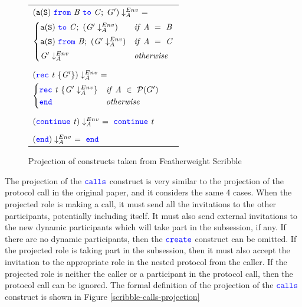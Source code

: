 \documentclass[12pt,twoside]{report}
\begin{document}
\begin{figure}[!h]
    \begin{center}
        \begin{tabular}{l}
            $(\scrmessage{a}{S}\ \from\ \mathit{B}\ \scrto\ \mathit{C};\ G') \project\ =\ $\\[3.5pt]
            \begin{math}
                \begin{cases}
                    \mathtt{a}(\mathtt{S})\ {\color{blue}\mathtt{to}}\ \mathit{C};\ (\mathit{G'} \downarrow_A^{Env}) & \mathit{if}\ \mathit{A}\ =\ \mathit{B}\\[3pt]
                    \mathtt{a}(\mathtt{S})\ {\color{blue}\mathtt{from}}\ \mathit{B};\ (\mathit{G'} \downarrow_A^{Env}) & \mathit{if}\ \mathit{A}\ =\ \mathit{C}\\[3pt]
                    \mathit{G'} \downarrow_A^{Env} & \mathit{otherwise}
                \end{cases}
            \end{math}
            \\\\
            $(\rec\ \mathit{t}\ \{\mathit{G'}\}) \project\ =$\\[3.5pt]
            \begin{math}
               \begin{cases}
                   {\color{blue}\mathtt{rec}}\ \mathit{t}\ \{\mathit{G'} \downarrow_A^{Env}\} & \mathit{if}\ \mathit{A}\ \in\ \mathcal{P}(G')\\
                   {\color{blue}\mathtt{end}} & \mathit{otherwise}
               \end{cases}
           \end{math}
           \\\\
           $(\continue\ \mathit{t}) \project\ =\ \continue\ \mathit{t}$
           \\\\
           $({\color{blue}\mathtt{end}}) \downarrow_A^{Env}\ =\ {\color{blue}\mathtt{end}}$
        \end{tabular}
    \end{center}
 
    \caption{Projection of constructs taken from Featherweight Scribble\cite{featherweight}}
    \label{featherweight-scribble-projections}
\end{figure}

The projection of the ${\color{blue}\mathtt{calls}}$ construct is very similar to the projection of the protocol call in the original paper\cite{nestedprotocols}, and it considers the same 4 cases. When the projected role is making a call, it must send all the invitations to the other participants, potentially including itself. It must also send external invitations to the new dynamic participants which will take part in the subsession, if any. If there are no dynamic participants, then the ${\color{blue}\mathtt{create}}$ construct can be omitted. If the projected role is taking part in the subsession, then it must also accept the invitation to the appropriate role in the nested protocol from the caller. If the projected role is neither the caller or a participant in the protocol call, then the protocol call can be ignored. The formal definition of the projection of the ${\color{blue}\mathtt{calls}}$ construct is shown in Figure \ref{scribble-calls-projection}\\
 
\end{document}

